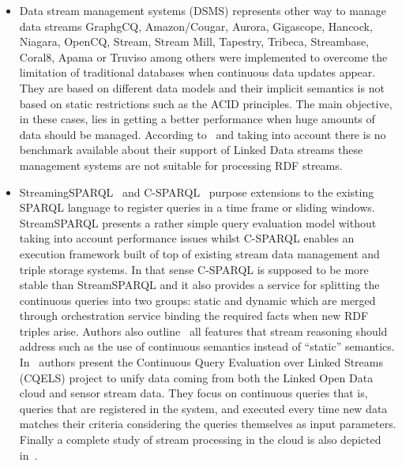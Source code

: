 \begin{itemize}
\item Data stream management systems (DSMS) represents other way to manage data streams GraphgCQ, Amazon/Cougar, Aurora, Gigascope, 
Hancock, Niagara, OpenCQ, Stream, Stream Mill, Tapestry, Tribeca, Streambase, Coral8, Apama or Truviso among others were implemented to overcome the 
limitation of traditional databases when continuous data updates appear. They are based on different data models and their implicit semantics is not 
based on static restrictions such as the ACID principles. The main objective, in these cases, lies in getting a better performance when 
huge amounts of data should be managed. According to~\cite{deri2010} and taking into account there is no benchmark 
available about their support of Linked Data streams these management systems are not suitable for processing RDF streams. 


\item StreamingSPARQL~\cite{Bolles:2008:SSE:1789394.1789438} and 
C-SPARQL~\cite{Barbieri:2010:EEC:1739041.1739095} purpose extensions to the 
existing SPARQL language to register queries in a time frame or sliding windows. 
StreamSPARQL presents a rather simple query evaluation model without taking into 
account performance issues whilst C-SPARQL enables an execution framework built 
of top of existing stream data management and triple storage systems. In that 
sense C-SPARQL is supposed to be more stable than StreamSPARQL and it also 
provides a service for splitting the continuous queries into two groups: static 
and dynamic which are merged through orchestration service binding the required 
facts when new RDF triples arise. Authors also outline~\cite{stream-reasoning-linked-data} all 
features that stream reasoning should address such as the use of continuous semantics instead 
of ``static'' semantics. In~\cite{deri2010} authors present the Continuous Query Evaluation 
over Linked Streams (CQELS) project to unify data coming from both the Linked 
Open Data cloud and sensor stream data. They focus on continuous queries that 
is, queries that are registered in the system, and executed every time new data 
matches their criteria considering the queries themselves as input parameters. 
Finally a complete study of stream processing in the cloud is also depicted in~\cite{Backman:2012:MPS:2169090.2169091}.


\end{itemize}
